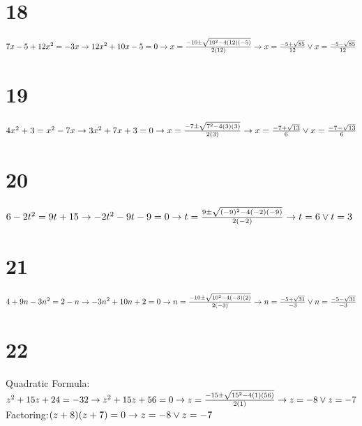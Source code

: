 \documentclass{article}
\theoremstyle{definition}
\begin{document}
\section*{18}
$7x-5+12x^2=-3x\newline\rightarrow 12x^2+10x-5=0\newline\rightarrow x=\frac{-10\pm\sqrt{10^2-4(12)(-5)}}{2(12)}\newline\rightarrow 
x=\frac{-5+\sqrt{85}}{12}\vee x=\frac{-5-\sqrt{85}}{12}$

\section*{19}
$4x^2+3=x^2-7x\newline\rightarrow 3x^2+7x+3=0\newline\rightarrow x=\frac{-7\pm\sqrt{7^2-4(3)(3)}}{2(3)}\newline\rightarrow 
x=\frac{-7+\sqrt{13}}{6}\vee x=\frac{-7-\sqrt{13}}{6}$

\section*{20}
$6-2t^2=9t+15\newline\rightarrow -2t^2-9t-9=0\newline\rightarrow t=\frac{9\pm\sqrt{(-9)^2-4(-2)(-9)}}{2(-2)}\newline\rightarrow 
t=6\vee t=3$

\section*{21}
$4+9n-3n^2=2-n\newline\rightarrow -3n^2+10n+2=0\newline\rightarrow n=\frac{-10\pm\sqrt{10^2-4(-3)(2)}}{2(-3)}\newline\rightarrow 
n=\frac{-5+\sqrt{31}}{-3}\vee n=\frac{-5-\sqrt{31}}{-3}$

\section*{22}
Quadratic Formula:\newline
$z^2+15z+24=-32\newline\rightarrow z^2+15z+56=0\newline\rightarrow z=\frac{-15\pm\sqrt{15^2-4(1)(56)}}{2(1)}\newline\rightarrow 
z=-8\vee z=-7$\newline 
Factoring:\newline $(z+8)(z+7)=0\newline\rightarrow z=-8\vee z=-7$
\end{document}
